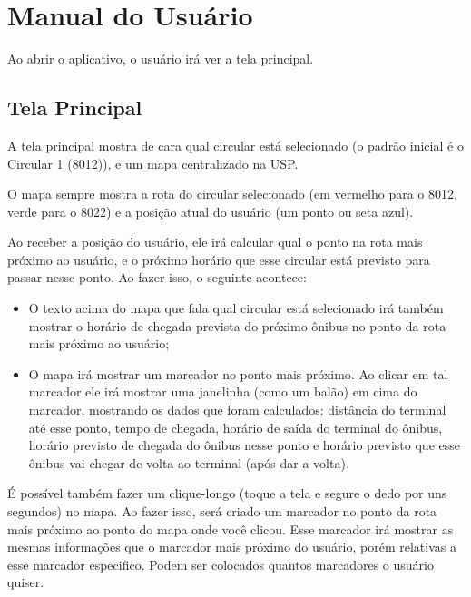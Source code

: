 




\cabecalho

\section{Manual do Usuário}
Ao abrir o aplicativo, o usuário irá ver a tela principal. 

\subsection{Tela Principal}
A tela principal mostra de cara qual circular está selecionado (o padrão inicial é o Circular 1 (8012)),
e um mapa centralizado na USP.

O mapa sempre mostra a rota do circular selecionado (em vermelho para o 8012, verde para o 8022) e a posição
atual do usuário (um ponto ou seta azul).

Ao receber a posição do usuário, ele irá calcular qual o ponto na rota mais próximo ao usuário, e o próximo horário
que esse circular está previsto para passar nesse ponto. Ao fazer isso, o seguinte acontece:
\begin{itemize}
    \item O texto acima do mapa que fala qual circular está selecionado
        irá também mostrar o horário de chegada prevista do próximo ônibus no ponto da rota mais próximo ao usuário;
    \item O mapa irá mostrar um marcador no ponto mais próximo. Ao clicar em tal marcador ele irá mostrar
        uma janelinha (como um balão) em cima do marcador, mostrando os dados que foram calculados: distância
        do terminal até esse ponto, tempo de chegada, horário de saída do terminal do ônibus, horário previsto de chegada
        do ônibus nesse ponto e horário previsto que esse ônibus vai chegar de volta ao terminal (após dar a volta).
\end{itemize}

É possível também fazer um clique-longo (toque a tela e segure o dedo por uns segundos) no mapa. Ao fazer isso,
será criado um marcador no ponto da rota mais próximo ao ponto do mapa onde você clicou. Esse marcador irá mostrar as
mesmas informações que o marcador mais próximo do usuário, porém relativas a esse marcador especifico.
Podem ser colocados quantos marcadores o usuário quiser.

